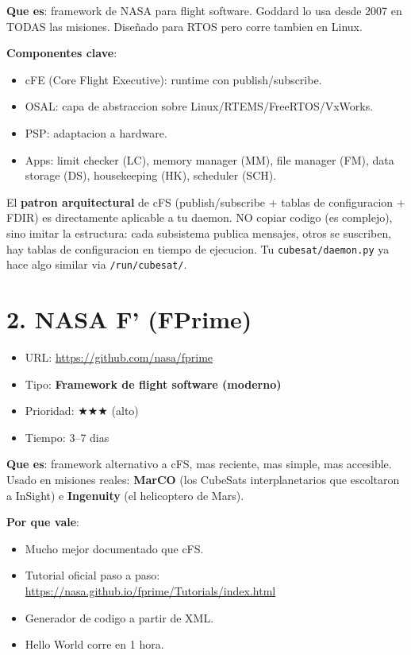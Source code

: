 \documentclass[11pt,a4paper,oneside]{report}
\begin{document}
\textbf{Que es}: framework de NASA para flight software. Goddard lo usa
desde 2007 en TODAS las misiones. Diseñado para RTOS pero corre tambien
en Linux.

\textbf{Componentes clave}:
\begin{itemize}[leftmargin=2em]
  \item cFE (Core Flight Executive): runtime con publish/subscribe.
  \item OSAL: capa de abstraccion sobre Linux/RTEMS/FreeRTOS/VxWorks.
  \item PSP: adaptacion a hardware.
  \item Apps: limit checker (LC), memory manager (MM), file manager (FM),
        data storage (DS), housekeeping (HK), scheduler (SCH).
\end{itemize}

\begin{nota}
El \textbf{patron arquitectural} de cFS (publish/subscribe + tablas de
configuracion + FDIR) es directamente aplicable a tu daemon. NO copiar
codigo (es complejo), sino imitar la estructura: cada subsistema publica
mensajes, otros se suscriben, hay tablas de configuracion en tiempo de
ejecucion. Tu \texttt{cubesat/daemon.py} ya hace algo similar via
\texttt{/run/cubesat/}.
\end{nota}

\section{2. NASA F' (FPrime)}

\begin{itemize}[leftmargin=1.5em]
  \item URL: \url{https://github.com/nasa/fprime}
  \item Tipo: \textbf{Framework de flight software (moderno)}
  \item Prioridad: $\bigstar\bigstar\bigstar$ (alto)
  \item Tiempo: 3--7 dias
\end{itemize}

\textbf{Que es}: framework alternativo a cFS, mas reciente, mas simple,
mas accesible. Usado en misiones reales: \textbf{MarCO} (los CubeSats
interplanetarios que escoltaron a InSight) e \textbf{Ingenuity} (el
helicoptero de Mars).

\textbf{Por que vale}:
\begin{itemize}[leftmargin=2em]
  \item Mucho mejor documentado que cFS.
  \item Tutorial oficial paso a paso: \url{https://nasa.github.io/fprime/Tutorials/index.html}
  \item Generador de codigo a partir de XML.
  \item Hello World corre en 1 hora.
\end{itemize}
\end{document}
